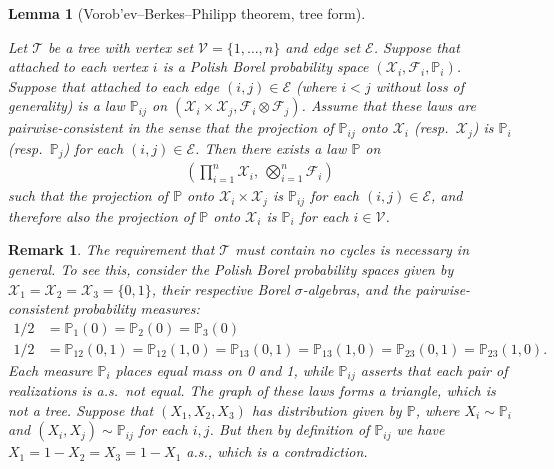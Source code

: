 \documentclass[11pt,lof]{puthesis}
\renewcommand{\P}{\ensuremath{\mathbb{P}}}
\newcommand{\cF}{\ensuremath{\mathcal{F}}}
\newcommand{\cX}{\ensuremath{\mathcal{X}}}
\newcommand{\cT}{\ensuremath{\mathcal{T}}}
\newcommand{\cV}{\ensuremath{\mathcal{V}}}
\newcommand{\cE}{\ensuremath{\mathcal{E}}}
\theoremstyle{break}
\newtheorem{lemma}{Lemma}[section]
\newtheorem{remark}{Remark}[section]
\theoremstyle{proof}
\begin{document}
\begin{lemma}[Vorob'ev--Berkes--Philipp theorem, tree form]
  \label{lem:kernel_app_vbp}

  Let $\cT$ be a tree with vertex set $\cV = \{1, \ldots, n\}$
  and edge set $\cE$.
  Suppose that attached to each vertex $i$ is a
  Polish Borel probability space
  $(\cX_i, \cF_i, \P_i)$.
  Suppose that attached to each edge $(i,j) \in \cE$
  (where $i<j$ without loss of generality)
  is a law $\P_{i j}$ on
  $(\cX_i \times \cX_j, \cF_i \otimes \cF_j)$.
  Assume that these laws are pairwise-consistent in the sense that
  the projection of $\P_{i j}$ onto
  $\cX_i$ (resp.\ $\cX_j$) is $\P_i$ (resp.\ $\P_j$)
  for each $(i,j) \in \cE$.
  Then there exists a law $\P$ on
  \begin{align*}
    \left(
      \prod_{i=1}^n \cX_i, \
      \bigotimes_{i=1}^n \cF_i
    \right)
  \end{align*}
  such that the projection of $\P$
  onto $\cX_i \times \cX_j$
  is $\P_{i j}$ for each $(i,j) \in \cE$,
  and therefore also the projection of $\P$
  onto $\cX_i$ is $\P_i$ for each $i \in \cV$.

\end{lemma}

\begin{remark}
  The requirement that $\cT$ must contain no cycles
  is necessary in general.
  To see this, consider the Polish Borel probability spaces
  given by
  $\cX_1 = \cX_2 = \cX_3 = \{0,1\}$,
  their respective Borel $\sigma$-algebras,
  and the pairwise-consistent probability measures:
  \begin{align*}
    1/2
    &=
    \P_1(0) = \P_2(0) = \P_3(0) \\
    1/2
    &=
    \P_{12}(0,1) = \P_{12}(1,0) =
    \P_{13}(0,1) = \P_{13}(1,0) =
    \P_{23}(0,1) = \P_{23}(1,0).
  \end{align*}
  Each measure $\P_i$ places equal mass on 0 and 1, while $\P_{i j}$
  asserts that each pair of realizations is a.s.\ not equal.
  The graph of these laws forms a triangle,
  which is not a tree.
  Suppose that $(X_1,X_2,X_3)$ has distribution given by $\P$,
  where $X_i \sim \P_i$ and $(X_i,X_j) \sim \P_{i j}$
  for each $i,j$.
  But then by definition of $\P_{i j}$ we have
  $X_1 = 1-X_2 = X_3 = 1-X_1$ a.s.,
  which is a contradiction.

\end{remark}
\end{document}
